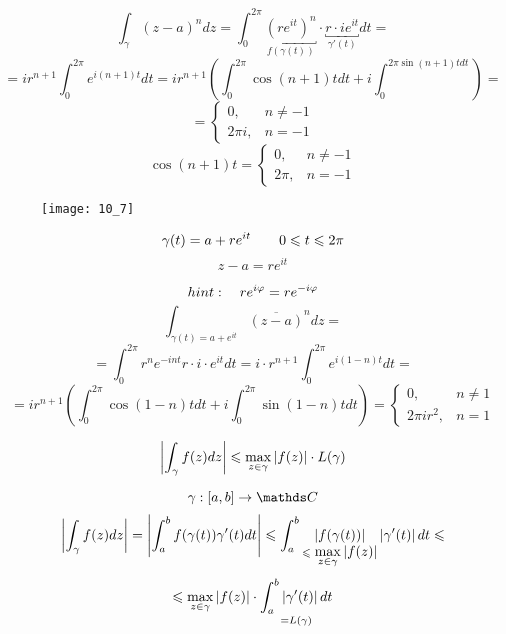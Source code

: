\documentclass[main]{subfiles}
\begin{document}
    \begin{Example}[1]
        \[\int_\gamma (z - a)^n dz = \int_0^{2\pi} \underbracket{(re^{it} )^n
            }_{f(\gamma(t))} \cdot \underbracket{r \cdot ie^{it} }_{\gamma'(t)} dt = \]
        \[=ir^{n + 1} \int_0^{2\pi}e^{i(n + 1)t}dt = ir^{n + 1} (\int_0^{2\pi}
            \cos(n + 1)tdt + i\int_0^{2\pi \sin(n + 1)tdt} ) =   \]
        \[= \begin{cases}
                0,      & n \neq -1 \\
                2\pi i, & n = -1
            \end{cases}\]
        \[\cos(n + 1)t = \begin{cases}
                0,    & n \neq -1 \\
                2\pi, & n = -1
            \end{cases}\]
        \begin{figure}[H]
            \centering
            \texttt{[image: 10\_7]}
        \end{figure}
        \[\gamma(t) = a + re^{it} \qquad 0 \leqslant t \leqslant 2\pi \]
        \[z - a = re^{it} \]
    \end{Example}

    \begin{Example}[2]
        \[hint: \quad r e^{i\varphi} = r e^{-i \varphi}  \]
        \[\int_{\gamma(t) = a + e^{it} } \overline{(z - a)}^n dz =  \]
        \[=\int_0^{2\pi} r^n e^{-int} r \cdot i \cdot e^{it}dt =
            i \cdot r^{n + 1}  \int_0^{2\pi} e^{i(1 - n)t}dt =  \]
        \[=ir^{n + 1} \left(\int_0^{2\pi} \cos(1 - n)tdt + i\int_0^{2\pi}
            \sin(1 - n)tdt\right) = \begin{cases}
                0,          & n \neq 1 \\
                2\pi i r^2, & n = 1
            \end{cases}\]
    \end{Example}

    \begin{Utv}
        \[\left|\int_\gamma f(z)dz\right| \leqslant \max_{z \in \gamma} \left|f(z)\right| \cdot L(\gamma)\]
    \end{Utv}

    \begin{Proof}
        \[\gamma : [a, b] \to \CC\]
        \[\left|\int_\gamma f(z)dz\right| = \left|\int_a^b f(\gamma(t)) \gamma'(t)dt\right| \leqslant
            \int_a^b \underset{\leqslant \displaystyle \max_{z \in \gamma}
                \left|f(z)\right|}{\left|f(\gamma(t))\right| }\left|\gamma'(t)\right|dt \leqslant \]
        \[\leqslant \max_{z \in \gamma} \left|f(z)\right| \cdot \underset{= L(\gamma)}{\int_a^b \left|\gamma'(t)\right|dt }\]
    \end{Proof}
\end{document}
